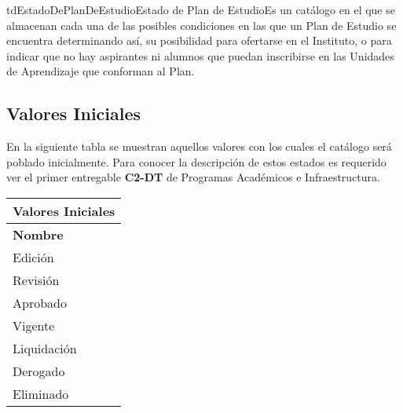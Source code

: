 \begin{TipoDeDato}{tdEstadoDePlanDeEstudio}{Estado de Plan de Estudio}{Es un catálogo en el que se almacenan cada una de las posibles condiciones en las que un Plan de Estudio se encuentra determinando así, su posibilidad para ofertarse en el Instituto, o para indicar que no hay aspirantes ni alumnos que puedan inscribirse en las Unidades de Aprendizaje que conforman al Plan.}

	\begin{tdAtributos}
	\end{tdAtributos}
	
	\subsection{Valores Iniciales}

	 En la siguiente tabla se muestran aquellos valores con los cuales el catálogo será poblado inicialmente. Para conocer la descripción de estos estados es requerido ver el primer entregable \textbf{C2-DT} de Programas Académicos e Infraestructura.\cdtEmpty
		
		\begin{longtable}{| p{}| }
	 			\rowcolor{colorPrincipal}
	 			\bf \color{white} Valores Iniciales\\
	 			\hline
	 			\rowcolor{colorSecundario}
	 			\bf \color{white} Nombre  \\
	 			\hline
	 			Edición\\
	 			\hline
	 			Revisión\\
	 			\hline
	 			Aprobado\\
	 			\hline
	 			Vigente\\
	 			\hline
	 			Liquidación\\
	 			\hline
	 			Derogado\\
	 			\hline
	 			Eliminado\\
	 			\hline
	 		\end{longtable}
\end{TipoDeDato}

